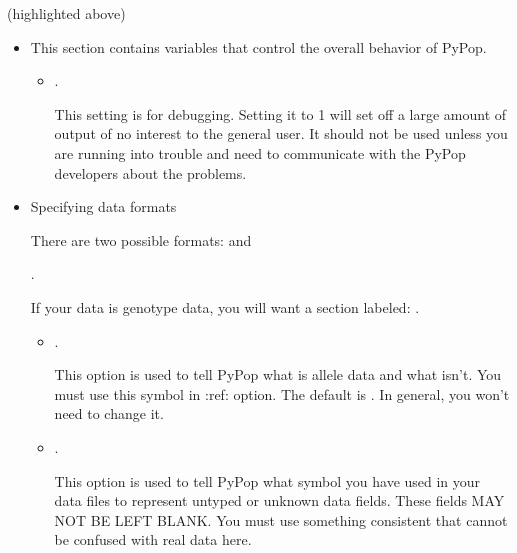 \documentclass[letterpaper,10pt,english,openany,oneside]{sphinxmanual}
\begin{document}
\sphinxAtStartPar
{} (highlighted above)
\begin{itemize}
\item {} 
\sphinxAtStartPar
\sphinxcode{\sphinxupquote{{[}General{]}}}

\sphinxAtStartPar
This section contains variables that control the overall behavior of
PyPop.
\begin{itemize}
\item {} 
\sphinxAtStartPar
{}.

\sphinxAtStartPar
This setting is for debugging. Setting it to 1 will set off a
large amount of output of no interest to the general user. It
should not be used unless you are running into trouble and need to
communicate with the PyPop developers about the problems.

\end{itemize}

\item {} 
\sphinxAtStartPar
Specifying data formats

\sphinxAtStartPar
There are two possible formats: \sphinxcode{\sphinxupquote{{[}ParseGenotypeFile{]}}} and
\sphinxcode{\sphinxupquote{{[}ParseAlleleCountFile{]}}}

\sphinxAtStartPar
\sphinxcode{\sphinxupquote{{[}ParseGenotypeFile{]}}}.

\sphinxAtStartPar
If your data is genotype data, you will want a section labeled:
\sphinxcode{\sphinxupquote{{[}ParseGenotypeFile{]}}}.
\begin{itemize}
\item {} 
\sphinxAtStartPar
{}.

\sphinxAtStartPar
This option is used to tell PyPop what is allele data and what
isn’t. You must use this symbol in :ref:
option. The default is \sphinxcode{\sphinxupquote{*}}. In general, you won’t need to
change it. \sphinxstylestrong{{[}Default:} \sphinxcode{\sphinxupquote{*}} \sphinxstylestrong{{]}}

\item {} 
\sphinxAtStartPar
{}.

\sphinxAtStartPar
This option is used to tell PyPop what symbol you have used in
your data files to represent untyped or unknown data
fields. These fields MAY NOT BE LEFT BLANK. You must use
something consistent that cannot be confused with real data
here. \sphinxstylestrong{{[}Default:} \sphinxcode{\sphinxupquote{****}} \sphinxstylestrong{{]}}

\end{itemize}

\end{itemize}
\end{document}
